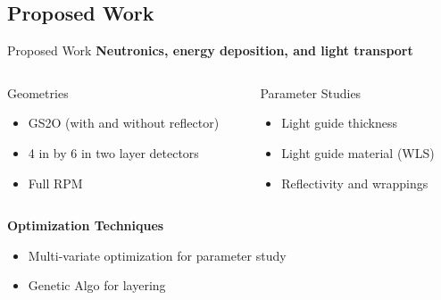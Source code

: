 \subsection{Proposed Work}
\begin{frame}{Proposed Work}
  \textbf{Neutronics, energy deposition, and light transport}
  \vspace{0.5cm}
  \begin{columns}[onlytextwidth]
    \begin{column}{0.45\textwidth}
      Geometries
      \begin{itemize}
        \item GS2O  (with and without reflector)
        \item 4 in by 6 in two layer detectors
        \item Full RPM
      \end{itemize}
    \end{column}
    \begin{column}{0.45\textwidth}
      Parameter Studies
      \begin{itemize}
        \item Light guide thickness
        \item Light guide material (WLS)
        \item Reflectivity and wrappings
      \end{itemize}
    \end{column}
  \end{columns}
  \vspace{0.5cm}
  \textbf{Optimization Techniques}
  \vspace{0.5cm}
  \begin{itemize}
    \item Multi-variate optimization for parameter study
    \item Genetic Algo for layering
  \end{itemize}
\hyperlink{G4Intro}{}
\end{frame}

